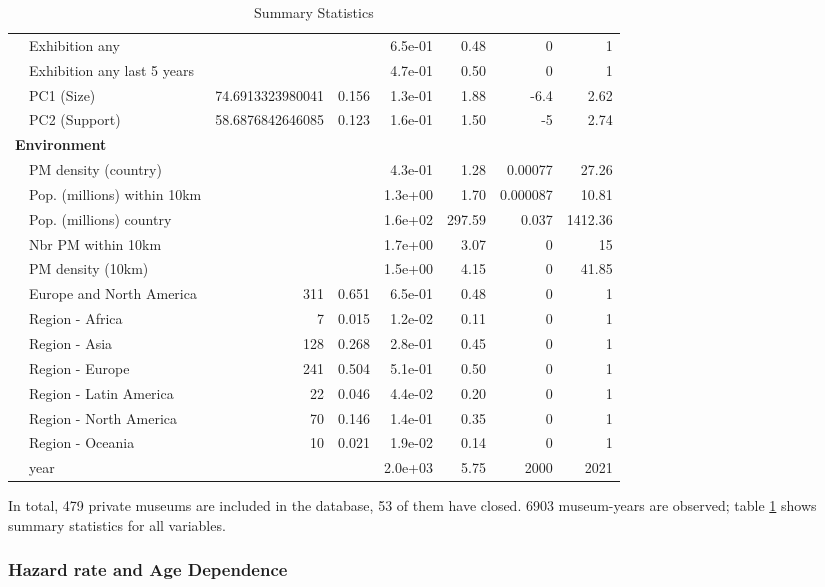 \documentclass[12pt]{article}
\begin{document}
\begin{table}[ht]
\begin{tabular}{llrrrrrr}
   & Exhibition any &  &  & 6.5e-01 &   0.48 & 0 & 1 \\ 
   & Exhibition any last 5 years &  &  & 4.7e-01 &   0.50 & 0 & 1 \\ 
   & PC1 (Size) & 74.6913323980041 & 0.156 & 1.3e-01 &   1.88 & -6.4 & 2.62 \\ 
   & PC2 (Support) & 58.6876842646085 & 0.123 & 1.6e-01 &   1.50 & -5 & 2.74 \\ 
   \multicolumn{8}{l}{\textbf{Environment}} \\ 
 & PM density (country) &  &  & 4.3e-01 &   1.28 & 0.00077 & 27.26 \\ 
   & Pop. (millions) within 10km &  &  & 1.3e+00 &   1.70 & 0.000087 & 10.81 \\ 
   & Pop. (millions) country &  &  & 1.6e+02 & 297.59 & 0.037 & 1412.36 \\ 
   & Nbr PM within 10km &  &  & 1.7e+00 &   3.07 & 0 & 15 \\ 
   & PM density (10km) &  &  & 1.5e+00 &   4.15 & 0 & 41.85 \\ 
   & Europe and North America & 311 & 0.651 & 6.5e-01 &   0.48 & 0 & 1 \\ 
   & Region - Africa & 7 & 0.015 & 1.2e-02 &   0.11 & 0 & 1 \\ 
   & Region - Asia & 128 & 0.268 & 2.8e-01 &   0.45 & 0 & 1 \\ 
   & Region - Europe & 241 & 0.504 & 5.1e-01 &   0.50 & 0 & 1 \\ 
   & Region - Latin America & 22 & 0.046 & 4.4e-02 &   0.20 & 0 & 1 \\ 
   & Region - North America & 70 & 0.146 & 1.4e-01 &   0.35 & 0 & 1 \\ 
   & Region - Oceania & 10 & 0.021 & 1.9e-02 &   0.14 & 0 & 1 \\ 
   & year &  &  & 2.0e+03 &   5.75 & 2000 & 2021 \\ 
   \hline
\end{tabular}
\caption{Summary Statistics} 
\label{tbl:t_sumstats}
\end{table}

In total, 479 private museums are included in the database, 53 of them have closed.
6903 museum-years are observed; table \ref{tbl:t_sumstats} shows summary statistics for all variables.

\subsubsection*{Hazard rate and Age Dependence}
\end{document}
